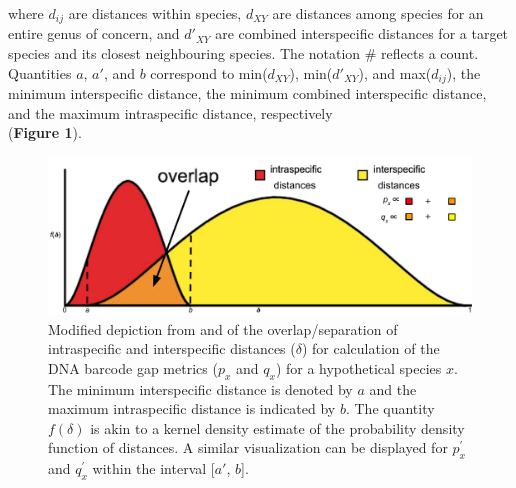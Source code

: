 \documentclass[12pt]{article}
\begin{document}
\noindent where $d_{ij}$ are distances within species, $d_{XY}$ are distances among species for an entire genus of concern, and $d'_{XY}$ are combined interspecific distances for a target species and its closest neighbouring species. The notation \# reflects a count.  Quantities $a$, $a'$, and $b$ correspond to min($d_{XY}$), min($d'_{XY}$), and max($d_{ij}$), the minimum interspecific distance, the minimum combined interspecific distance, and the maximum intraspecific distance, respectively \\ (\textbf{Figure 1}). 

\begin{figure}[H]

\centering

\includegraphics[width=1.0\textwidth]{Figure1}

\caption{Modified depiction from \citet{meyer2005dna} and \citet{phillips2024measure} of the overlap/separation of intraspecific and interspecific distances ($\delta$) for calculation of the DNA barcode gap metrics ($p_x$ and $q_x$) for a hypothetical species $x$. The minimum interspecific distance is denoted by $a$ and the maximum intraspecific distance is indicated by $b$. The quantity $f(\delta)$ is akin to a kernel density estimate of the probability density function of distances. A similar visualization can be displayed for $p^{'}_x$ and $q^{'}_x$ within the interval [$a'$, $b$].}

\end{figure}
\end{document}
